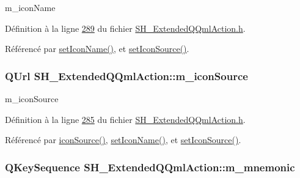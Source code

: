 m\-\_\-icon\-Name 



Définition à la ligne \hyperlink{SH__ExtendedQQmlAction_8h_source_l00289}{289} du fichier \hyperlink{SH__ExtendedQQmlAction_8h_source}{S\-H\-\_\-\-Extended\-Q\-Qml\-Action.\-h}.



Référencé par \hyperlink{classSH__ExtendedQQmlAction_a348526d65cd47b4ea6378e2a62065135}{set\-Icon\-Name()}, et \hyperlink{classSH__ExtendedQQmlAction_ae34fe314ba335d65d99932b27f1404f7}{set\-Icon\-Source()}.

\hypertarget{classSH__ExtendedQQmlAction_a61c8633eab1fa3b69752074220e785fc}{
\subsubsection[{m\-\_\-icon\-Source}]{\setlength{\rightskip}{0pt plus 5cm}Q\-Url S\-H\-\_\-\-Extended\-Q\-Qml\-Action\-::m\-\_\-icon\-Source\hspace{0.3cm}{\ttfamily [private]}}}\label{classSH__ExtendedQQmlAction_a61c8633eab1fa3b69752074220e785fc}


m\-\_\-icon\-Source 



Définition à la ligne \hyperlink{SH__ExtendedQQmlAction_8h_source_l00285}{285} du fichier \hyperlink{SH__ExtendedQQmlAction_8h_source}{S\-H\-\_\-\-Extended\-Q\-Qml\-Action.\-h}.



Référencé par \hyperlink{classSH__ExtendedQQmlAction_a4256635783087124d3df6fa9726e7d55}{icon\-Source()}, \hyperlink{classSH__ExtendedQQmlAction_a348526d65cd47b4ea6378e2a62065135}{set\-Icon\-Name()}, et \hyperlink{classSH__ExtendedQQmlAction_ae34fe314ba335d65d99932b27f1404f7}{set\-Icon\-Source()}.

\hypertarget{classSH__ExtendedQQmlAction_a7c924c07aa50a7228b6e8f31c4520896}{
\subsubsection[{m\-\_\-mnemonic}]{\setlength{\rightskip}{0pt plus 5cm}Q\-Key\-Sequence S\-H\-\_\-\-Extended\-Q\-Qml\-Action\-::m\-\_\-mnemonic\hspace{0.3cm}{\ttfamily [private]}}}\label{classSH__ExtendedQQmlAction_a7c924c07aa50a7228b6e8f31c4520896}


